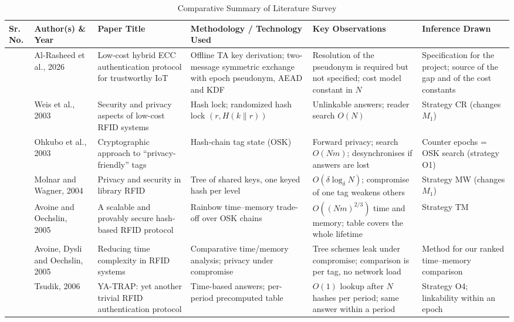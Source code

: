 \FloatBarrier
\begin{table}[H]
\centering
\caption{Comparative Summary of Literature Survey}
\label{tab:litsurvey}
\footnotesize
\renewcommand{\arraystretch}{1.15}
\begin{tabularx}{\textwidth}{|>{\centering\arraybackslash}p{}|p{}|>{\raggedright\arraybackslash}p{}|>{\raggedright\arraybackslash}X|>{\raggedright\arraybackslash}X|>{\raggedright\arraybackslash}X|}
\hline
\textbf{Sr. No.} & \textbf{Author(s) \& Year} & \textbf{Paper Title} & \textbf{Methodology / Technology Used} & \textbf{Key Observations} & \textbf{Inference Drawn}\\ \hline
1 & Al-Rasheed et al., 2026~\cite{base} & Low-cost hybrid ECC authentication protocol for trustworthy IoT & Offline TA key derivation; two-message symmetric exchange with epoch pseudonym, AEAD and KDF & Resolution of the pseudonym is required but not specified; cost model constant in $N$ & Specification for the project; source of the gap and of the cost constants\\ \hline
2 & Weis et al., 2003~\cite{weis} & Security and privacy aspects of low-cost RFID systems & Hash lock; randomized hash lock $(r,H(k\|r))$ & Unlinkable answers; reader search $O(N)$ & Strategy CR (changes $M_1$)\\ \hline
3 & Ohkubo et al., 2003~\cite{ohkubo} & Cryptographic approach to ``privacy-friendly'' tags & Hash-chain tag state (OSK) & Forward privacy; search $O(Nm)$; desynchronises if answers are lost & Counter epochs = OSK search (strategy O1)\\ \hline
4 & Molnar and Wagner, 2004~\cite{molnar} & Privacy and security in library RFID & Tree of shared keys, one keyed hash per level & $O(\delta\log_\delta N)$; compromise of one tag weakens others & Strategy MW (changes $M_1$)\\ \hline
5 & Avoine and Oechslin, 2005~\cite{avoine05} & A scalable and provably secure hash-based RFID protocol & Rainbow time--memory trade-off over OSK chains & $O((Nm)^{2/3})$ time and memory; table covers the whole lifetime & Strategy TM\\ \hline
6 & Avoine, Dysli and Oechslin, 2005~\cite{ado05} & Reducing time complexity in RFID systems & Comparative time/memory analysis; privacy under compromise & Tree schemes leak under compromise; comparison is per tag, no network load & Method for our ranked time--memory comparison\\ \hline
7 & Tsudik, 2006~\cite{tsudik} & YA-TRAP: yet another trivial RFID authentication protocol & Time-based answers; per-period precomputed table & $O(1)$ lookup after $N$ hashes per period; same answer within a period & Strategy O4; linkability within an epoch\\ \hline
\end{tabularx}
\end{table}


